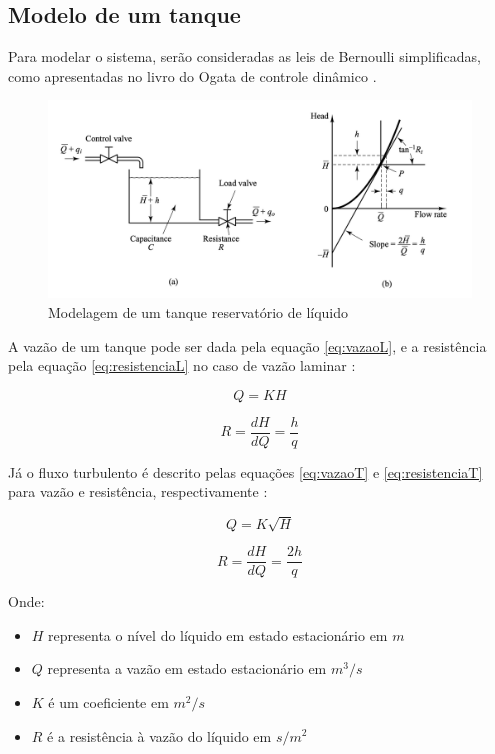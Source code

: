 \documentclass[a4paper,11pt]{article}
\begin{document}
\subsection{Modelo de um tanque} \label{sect:modmat}

Para modelar o sistema, serão consideradas as leis de Bernoulli simplificadas, como apresentadas no livro do Ogata de controle dinâmico \cite{ogatadinamico}.

\begin{figure}[H]
    \centering
    \includegraphics[width=0.8\linewidth]{img/1modelagem/teoria.png}
    \caption{Modelagem de um tanque reservatório de líquido}
    \label{fig:1tq}
\end{figure}

A vazão de um tanque pode ser dada pela equação \ref{eq:vazaoL}, e a resistência pela equação \ref{eq:resistenciaL} no caso de vazão laminar \cite{ogatadinamico}:

\begin{equation}
    Q = K H
    \label{eq:vazaoL}
\end{equation}

\begin{equation}
    R = \frac{dH}{dQ} = \frac{h}{q}
    \label{eq:resistenciaL}
\end{equation}

Já o fluxo turbulento é descrito pelas equações \ref{eq:vazaoT} e \ref{eq:resistenciaT} para vazão e resistência, respectivamente \cite{ogatadinamico}:

\begin{equation}
    Q = K \sqrt{H}
    \label{eq:vazaoT}
\end{equation}

\begin{equation}
    R = \frac{dH}{dQ} = \frac{2h}{q}
    \label{eq:resistenciaT}
\end{equation}

Onde:

\begin{itemize}
    \item $H$ representa o nível do líquido em estado estacionário em $m$
    \item $Q$ representa a vazão em estado estacionário em $m^3/s$
    \item $K$ é um coeficiente em $m^2/s$
    \item $R$ é a resistência à vazão do líquido em $s/m^2$
\end{itemize}
\end{document}
